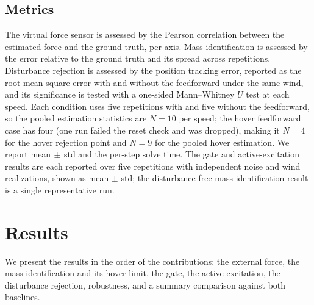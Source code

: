 \documentclass{ieeeaccess}
\begin{document}
\subsection{Metrics}
The virtual force sensor is assessed by the Pearson correlation between the
estimated force and the ground truth, per axis. Mass identification is assessed
by the error relative to the ground truth and its spread across repetitions.
Disturbance rejection is assessed by the position tracking error, reported as the
root-mean-square error with and without the feedforward under the same wind, and
its significance is tested with a one-sided Mann--Whitney $U$ test at each speed.
Each condition uses five repetitions with and five without the feedforward, so the
pooled estimation statistics are $N=10$ per speed; the hover feedforward case has
four (one run failed the reset check and was dropped), making it $N=4$ for the
hover rejection point and $N=9$ for the pooled hover estimation. We report
mean$\,\pm\,$std and the per-step solve time. The gate and active-excitation
results are each reported over five repetitions with independent noise and wind
realizations, shown as mean $\pm$ std; the disturbance-free mass-identification
result is a single representative run.

\section{Results}\label{sec:results}

We present the results in the order of the contributions: the external force, the
mass identification and its hover limit, the gate, the active excitation, the
disturbance rejection, robustness, and a summary comparison against both
baselines.
\end{document}
